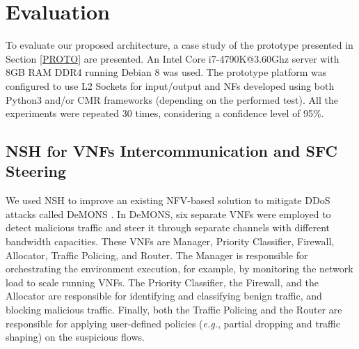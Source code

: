 \section{Evaluation}

To evaluate our proposed architecture, a case study of the prototype presented in Section \ref{PROTO} are presented. An Intel Core i7-4790K@3.60Ghz server with 8GB RAM DDR4 running Debian 8 was used. The prototype platform was configured to use L2 Sockets for input/output and NFs developed using both Python3 and/or CMR frameworks (depending on the performed test). All the experiments were repeated 30 times, considering a confidence level of 95\%.


\subsection{NSH for VNFs Intercommunication and SFC Steering}

We used NSH to improve an existing NFV-based solution to mitigate DDoS attacks called DeMONS \cite{Garcia-2018}. In DeMONS, six separate VNFs were employed to detect malicious traffic and steer it through separate channels with different bandwidth capacities. These VNFs are Manager, Priority Classifier, Firewall, Allocator, Traffic Policing, and Router. The Manager is responsible for orchestrating the environment execution, for example, by monitoring the network load to scale running VNFs. The Priority Classifier, the Firewall, and the Allocator are responsible for identifying and classifying benign traffic, and blocking malicious traffic. Finally, both the Traffic Policing and the Router are responsible for applying user-defined policies (\textit{e.g.}, partial dropping and traffic shaping) on the suspicious flows.

